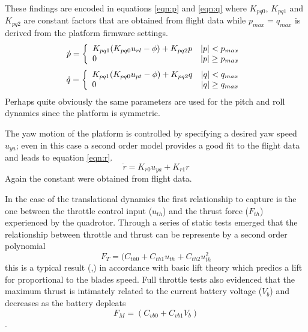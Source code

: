 \documentclass[a4paper,11pt]{report}
\begin{document}
These findings are encoded in equations \ref{eqn:p} and \ref{eqn:q} where $K_{pq0}$, $K_{pq1}$ and $K_{pq2}$ are constant factors that are obtained from flight data while $p_{max}=q_{max}$ is derived from the platform firmware settings.
\begin{equation}\label{eqn:p}
\dot{p}  =  \left\{ \begin{array}{l l} K_{pq1} (K_{pq0} u_{rl} - \phi) + K_{pq2} p & |p|<p_{max} \\ 0  & |p|\geq p_{max} \end{array} \right .\\
\end{equation}
\begin{equation}\label{eqn:q}
\dot{q}  =  \left\{ \begin{array}{l l} K_{pq1} (K_{pq0} u_{pt} - \phi) + K_{pq2} q & |q|<q_{max} \\ 0  & |q|\geq q_{max} \end{array} \right .\\
\end{equation}
Perhaps quite obviously the same parameters are used for the pitch and roll dynamics since the platform is symmetric. 


The yaw motion of the platform is controlled by specifying a desired yaw speed $u_{ya}$; even in this case a second order model provides a good fit to the flight data and leads to equation \ref{eqn:r}. 
\begin{equation}\label{eqn:r}
\dot{r} = K_{r0} u_{ya} + K_{r1} r
\end{equation}
Again the constant were obtained from flight data. 

In the case of the translational dynamics the first relationship to capture is the one between the throttle control input ($u_{th}$) and the thrust force ($F_{th}$) experienced by the quadrotor. 
Through a series of static tests emerged that the relationship between throttle and thrust can be represente by a second order polynomial 
\begin{equation}
F_T = (C_{th0} + C_{th1} u_{th} + C_{th2} u^2_{th} \label{eqn:ft}
\end{equation}
 this is a typical result (\cite{denardi2010phd},\cite{hoffmann07quadrotor}) in accordance with basic lift theory which predics a lift for proportional to the blades speed.
Full throttle tests also evidenced that the maximum thrust is intimately related to the current battery voltage ($V_b$) and decreases as the battery depleats 
\begin{equation}
F_M = (C_{vb0}+C_{vb1} V_b) \label{eqn:fm}
\end{equation}.
\end{document}
